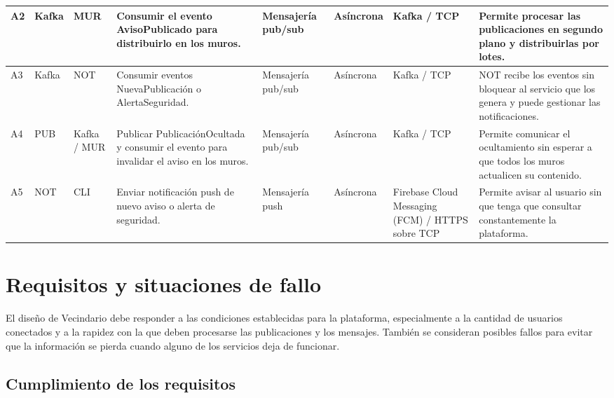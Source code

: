 \documentclass[12pt,a4paper]{article}
\begin{document}
\begin{landscape}
\begin{longtable}{
|p{0.7cm}
|p{2.1cm}
|p{2.1cm}
|p{3.5cm}
|p{1.7cm}
|p{1.7cm}
|p{2.8cm}
|p{5.0cm}|}
A2 & Kafka & MUR &
Consumir el evento AvisoPublicado para distribuirlo en los muros. &
Mensajería pub/sub & Asíncrona &
Kafka / TCP &
Permite procesar las publicaciones en segundo plano y distribuirlas por lotes. \\
\hline

A3 & Kafka & NOT &
Consumir eventos NuevaPublicación o AlertaSeguridad. &
Mensajería pub/sub & Asíncrona &
Kafka / TCP &
NOT recibe los eventos sin bloquear al servicio que los genera y puede gestionar las notificaciones. \\
\hline

A4 & PUB & Kafka / MUR &
Publicar PublicaciónOcultada y consumir el evento para invalidar el aviso en los muros. &
Mensajería pub/sub & Asíncrona &
Kafka / TCP &
Permite comunicar el ocultamiento sin esperar a que todos los muros actualicen su contenido. \\
\hline

A5 & NOT & CLI &
Enviar notificación push de nuevo aviso o alerta de seguridad. &
Mensajería push & Asíncrona &
Firebase Cloud Messaging (FCM) / HTTPS sobre TCP \cite{fcm} &
Permite avisar al usuario sin que tenga que consultar constantemente la plataforma. \\
\hline

\end{longtable}
\end{landscape}

\normalsize


\section{Requisitos y situaciones de fallo}

El diseño de Vecindario debe responder a las condiciones establecidas para la plataforma, especialmente a la cantidad de usuarios conectados y a la rapidez con la que deben procesarse las publicaciones y los mensajes. También se consideran posibles fallos para evitar que la información se pierda cuando alguno de los servicios deja de funcionar.

\subsection{Cumplimiento de los requisitos}
\end{document}
